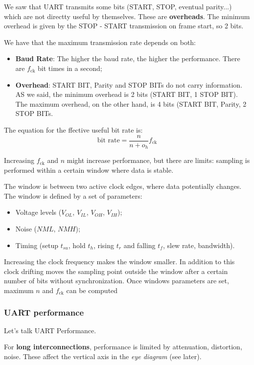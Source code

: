 \documentclass[a4paper,11pt]{article}
\begin{document}
We saw that UART transmits some bits (START, STOP, eventual parity...) which are not directty useful by themselves. These are \textbf{overheads}. The minimum overhead is given by the STOP - START transmission on frame start, so 2 bits.

We have that the maximum transmission rate depends on both:
\begin{itemize}
	\item \textbf{Baud Rate}:
	      The higher the baud rate, the higher the performance.
	      There are $f_\text{ck}$ bit times in a second;
	\item \textbf{Overhead}:
	      START BIT, Parity and STOP BITs do not carry information.
	      AS we said, the minimum overhead is 2 bits (START BIT, 1 STOP BIT).
	      The maximum overhead, on the other hand, is 4 bits (START BIT, Parity, 2 STOP BITs.
\end{itemize}

The equation for the ffective useful bit rate is:
$$
	\text{bit rate} = \frac{n}{n + o_h} f_\text{ck}
$$

Increasing $f_\text{ck}$ and $n$ might increase performance, but there are limits:
sampling is performed within a certain window where data is stable.

The window is between two active clock edges, where data potentially changes.
The window is defined by a set of parameters:
\begin{itemize}
	\item Voltage levels ($V_{OL}$, $V_{IL}$, $V_{OH}$, $V_{IH}$);
	\item Noise ($NML$, $NMH$);
	\item Timing (setup $t_{su}$, hold $t_h$, rising $t_r$ and falling $t_f$, slew rate, bandwidth).
\end{itemize}
Increasing the clock frequency makes the window smaller.
In addition to this clock drifting moves the sampling point outside the window after a certain number of bits without synchronization.
Once windows parameters are set, maximum $n$ and $f_\text{ck}$ can be computed

\subsubsection{UART performance}

Let's talk UART Performance.

For \textbf{long interconnections}, performance is limited by attenuation, distortion, noise.
These affect the vertical axis in the \textit{eye diagram} (see later).
\end{document}
